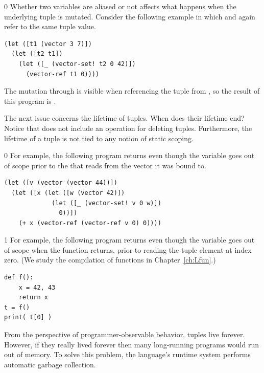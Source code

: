 \documentclass[7x10,nocrop]{TimesAPriori_MIT}%
\def\racketEd{0}
\def\pythonEd{1}
\def\edition{0}
\begin{document}
{\if\edition\racketEd        
Whether two variables are aliased or not affects what happens
when the underlying tuple is mutated.
Consider the following example in which  and 
again refer to the same tuple value.
\begin{center}
\begin{minipage}{0.96\textwidth}
\begin{lstlisting}
(let ([t1 (vector 3 7)])
  (let ([t2 t1])
    (let ([_ (vector-set! t2 0 42)])
      (vector-ref t1 0))))
\end{lstlisting}
\end{minipage}
\end{center}
The mutation through  is visible when referencing the tuple
from , so the result of this program is .
\fi}

The next issue concerns the lifetime of tuples. When does their
lifetime end?  Notice that \LangVec{} does not include an operation
for deleting tuples. Furthermore, the lifetime of a tuple is not tied
to any notion of static scoping.
%
{\if\edition\racketEd        
%
For example, the following program returns  even though the
variable  goes out of scope prior to the 
that reads from the vector it was bound to.
\begin{center}
\begin{minipage}{0.96\textwidth}
\begin{lstlisting}
(let ([v (vector (vector 44))])
  (let ([x (let ([w (vector 42)])
             (let ([_ (vector-set! v 0 w)])
               0))])
    (+ x (vector-ref (vector-ref v 0) 0))))
\end{lstlisting}
\end{minipage}
\end{center}
\fi}
%
{\if\edition\pythonEd
%
For example, the following program returns  even though the
variable  goes out of scope when the function returns, prior
to reading the tuple element at index zero. (We study the compilation
of functions in Chapter~\ref{ch:Lfun}.)
%  
\begin{center}
\begin{minipage}{0.96\textwidth}
\begin{lstlisting}
def f():
    x = 42, 43
    return x
t = f()
print( t[0] )
\end{lstlisting}
\end{minipage}
\end{center}
\fi}
%
From the perspective of programmer-observable behavior, tuples live
forever. However, if they really lived forever then many long-running
programs would run out of memory. To solve this problem, the
language's runtime system performs automatic garbage collection.
\end{document}
